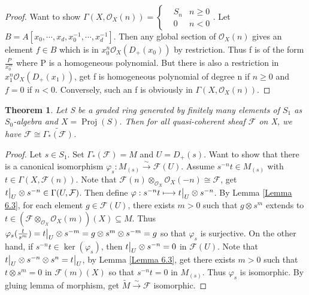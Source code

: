 \documentclass{ctexart}
\newtheorem{theorem}{Theorem}[section]
\newcommand{\proj}{\operatorname{Proj}}
\begin{document}
\begin{proof}
    Want to show $\Gamma(X, \mathcal{O}_{X}(n)) = 
    \left\{
        \begin{aligned}
            & S_{n} & n \ge 0 \\
            & 0 & n < 0
        \end{aligned}
    \right.
    $.
    Let $B = A[x_{0}, \cdots, x_{d}, x_{0}^{-1}, \cdots, x_{d}^{-1}]$.
    Then any global section  of $\mathcal{O}_{X}(n)$ gives an element $f\in B$ which is in $x_{0}^{n}\mathcal{O}_{X}(D_{+}(x_{0}))$ by restriction.
    Thus f is of the form $\frac{P}{x_{0}^{m}}$ where P is a homogeneous polynomial.
    But there is also a restriction in $x_{1}^{n}\mathcal{O}_{X}(D_{+}(x_{1}))$, get f is homogeneous polynomial of degree n if $n \ge 0$ and $f = 0$ if $n < 0$.
    Conversely, such an f is obviously in $\Gamma(X, \mathcal{O}_{X}(n))$.
\end{proof}
\begin{theorem}
    Let S be a graded ring generated by finitely many elements of $S_{1}$ as $S_{0}$-algebra and $X = \proj(S)$.
    Then for all quasi-coherent sheaf $\mathcal{F}$ on X, we have $\mathcal{F} \cong \widetilde{\Gamma_{\ast}(\mathcal{F})}$.
    \label{Theorem 6.4}
\end{theorem}
\begin{proof}
    Let $s\in S_{1}$.
    Set $\Gamma_{\ast}(\mathcal{F}) = M$ and $U = D_{+}(s)$.
    Want to show that there is a canonical isomorphism $\varphi_{s}: M_{(s)} \overset{\sim}{\longrightarrow} \mathcal{F}(U)$.
    Assume $s^{-n}t\in M_{(s)}$ with $t\in \Gamma(X, \mathcal{F}(n))$.
    Note that $\mathcal{F}(n) \otimes_{\mathcal{O}_{X}} \mathcal{O}_{X}(-n) \cong \mathcal{F}$, get $t\big{|}_{U} \otimes s^{-n}\in \Gamma(U, \mathcal{F})$.
    Then define $\varphi: s^{-n}t \longmapsto t\big{|}_{U} \otimes s^{-n}$.
    By Lemma \ref{Lemma 6.3}, for each element $g\in \mathcal{F}(U)$, there exists $m > 0$ such that $g \otimes s^{m}$ extends to $t\in (\mathcal{F} \otimes_{\mathcal{O}_{X}} \mathcal{O}_{X}(m))(X) \subseteq M$.
    Thus $\varphi_{s}(\frac{t}{s^{m}}) = t\big{|}_{U} \otimes s^{-m} = g \otimes s^{m} \otimes s^{-m} = g$ so that $\varphi_{s}$ is surjective.
    On the other hand, if $s^{-n}t\in \ker(\varphi_{s})$, then $t\big{|}_{U} \otimes s^{-n} = 0$ in $\mathcal{F}(U)$.
    Note that $t\big{|}_{U} \otimes s^{-n} \otimes s^{n} = t\big{|}_{U}$, by Lemma \ref{Lemma 6.3}, get there exists $m > 0$ such that $t \otimes s^{m} = 0$ in $\mathcal{F}(m)(X)$ so that $s^{-n}t = 0$ in $M_{(s)}$.
    Thus $\varphi_{s}$ is isomorphic.
    By gluing lemma of morphism, get $\widetilde{M} \overset{\sim}{\longrightarrow} \mathcal{F}$ isomorphic.
\end{proof}
\end{document}
